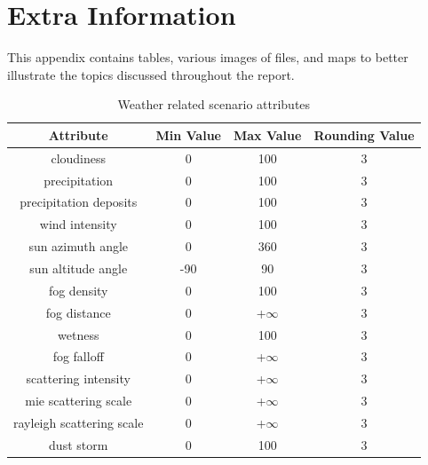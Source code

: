 \chapter{Extra Information} \label{chap:a}

This appendix contains tables, various images of files, and maps to better illustrate the topics discussed throughout the report.
\vspace{15pt}
\begin{table} [h] \label{tab1}
    \centering
    \begin{tabular}{||c c c c||} 
         \hline
 \textbf{Attribute} & \textbf{Min Value} & \textbf{Max Value} & \textbf{Rounding Value} \\ [0.5ex] 
 \hline\hline
cloudiness & 0 & 100 & 3 \\
\hline
precipitation & 0 & 100 & 3 \\
\hline
precipitation deposits & 0 & 100 & 3 \\
\hline
wind intensity & 0 & 100 & 3 \\
\hline
sun azimuth angle & 0 & 360 & 3 \\
\hline
sun altitude angle & -90 & 90 & 3 \\
\hline
fog density & 0 & 100 & 3 \\
\hline
fog distance & 0 & +$\infty$ & 3 \\
\hline
wetness & 0 & 100 & 3 \\
\hline
fog falloff & 0 & +$\infty$ & 3 \\
\hline
scattering intensity & 0 & +$\infty$ & 3 \\
\hline
mie scattering scale & 0 & +$\infty$ & 3 \\
\hline
rayleigh scattering scale & 0 & +$\infty$ & 3 \\
\hline
dust storm & 0 & 100 & 3 \\
 \hline
    \end{tabular}
    \caption{Weather related scenario attributes}
    \label{tab:weather_attributes}
\end{table}

